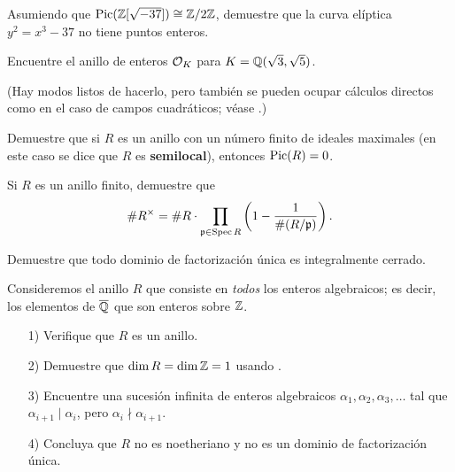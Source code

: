 \begin{ejercicio}
  Asumiendo que $\operatorname{Pic} (\mathbb{Z} [\sqrt{-37}]) \cong \mathbb{Z}/2\mathbb{Z}$,
  demuestre que la curva elíptica $y^2 = x^3 - 37$ no tiene puntos enteros.
\end{ejercicio}

\begin{ejercicio}
  Encuentre el anillo de enteros $\mathcal{O}_K$ para $K = \mathbb{Q} (\sqrt{3},\sqrt{5})$.

  (Hay modos listos de hacerlo, pero también se pueden ocupar cálculos directos
  como en el caso de campos cuadráticos; véase \cite{Williams-1970}.)
\end{ejercicio}

\begin{ejercicio}
  Demuestre que si $R$ es un anillo con un número finito de ideales maximales
  (en este caso se dice que $R$ es \textbf{semilocal}), entonces $\operatorname{Pic} (R) = 0$.
\end{ejercicio}

\begin{ejercicio}
  Si $R$ es un anillo finito, demuestre que
  \[ \# R^\times = \# R \cdot \prod_{\mathfrak{p} \in \operatorname{Spec} R}
                    \left(1 - \frac{1}{\# (R/\mathfrak{p})}\right). \]
\end{ejercicio}

\begin{ejercicio}
  Demuestre que todo dominio de factorización única es integralmente cerrado.
\end{ejercicio}

\begin{ejercicio}
  \label{ejerc:todos-enteros-algebraicos}
  Consideremos el anillo $R$ que consiste en \emph{todos} los enteros
  algebraicos; es decir, los elementos de $\overline{\mathbb{Q}}$ que son enteros sobre
  $\mathbb{Z}$.

  \begin{enumerate}
  \item[1)] Verifique que $R$ es un anillo.

  \item[2)] Demuestre que $\dim R = \dim \mathbb{Z} = 1$ usando
    \cite[Theorem 5.11]{Atiyah-Macdonald}.

  \item[3)] Encuentre una sucesión infinita de enteros algebraicos
    $\alpha_1, \alpha_2, \alpha_3, \ldots$ tal que $\alpha_{i+1}\mid\alpha_i$,
    pero $\alpha_i \nmid \alpha_{i+1}$.

  \item[4)] Concluya que $R$ no es noetheriano y no es un dominio de
    factorización única.
  \end{enumerate}
\end{ejercicio}

